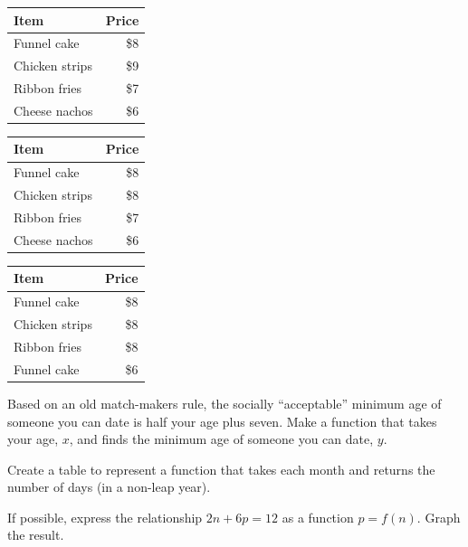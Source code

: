 \documentclass[../mathNotesPreamble]{subfiles}
\begin{document}
  \begin{tabular}{@{}lr@{}}\toprule
    Item& Price\\ \midrule
    Funnel cake& \$8\\
    Chicken strips& \$9\\
    Ribbon fries& \$7\\
    Cheese nachos& \$6\\
    \bottomrule
  \end{tabular}
  \begin{tabular}{@{}lr@{}}\toprule
    Item& Price\\ \midrule
    Funnel cake& \$8\\
    Chicken strips& \$8\\
    Ribbon fries& \$7\\
    Cheese nachos& \$6\\
    \bottomrule
  \end{tabular}
  \begin{tabular}{@{}lr@{}}
    \toprule
    Item& Price\\ \midrule
    Funnel cake& \$8\\
    Chicken strips& \$8\\
    Ribbon fries& \$8\\
    Funnel cake& \$6\\
    \bottomrule
  \end{tabular}

  \begin{ex*}
    Based on an old match-makers rule, the socially ``acceptable'' minimum age of someone you can date is half your age plus seven. Make a function that takes your age, $x$, and finds the minimum age of someone you can date, $y$.
  \end{ex*}
  \pagebreak

  \begin{ex*}
    Create a table to represent a function that takes each month and returns the number of days (in a non-leap year).
  \end{ex*}

  \begin{ex*}
    If possible, express the relationship $2n+6p=12$ as a function $p=f(n)$. Graph the result.
  \end{ex*}
\end{document}
